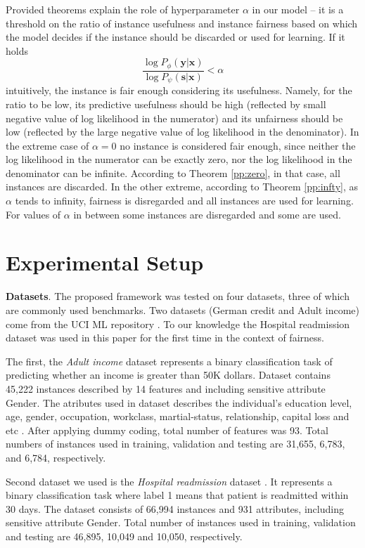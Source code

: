\documentclass[preprint,12pt]{elsarticle}
\begin{document}
Provided theorems explain the role of hyperparameter $\alpha$ in our model -- it is a threshold on the ratio of instance usefulness and instance fairness based on which the model decides if the instance should be discarded or used for learning.
If it holds
$$\frac{\log P_{\phi}(\mathbf{y}|\mathbf{x})}{\log P_{\psi}(\mathbf{s}|\mathbf{x})}<\alpha$$
intuitively, the instance is fair enough considering its usefulness. Namely, for the ratio to be low, its predictive usefulness should be high (reflected by small negative value of log likelihood in the numerator) and its unfairness should be low (reflected by the large negative value of log likelihood in the denominator). In the extreme case of $\alpha=0$ no instance is considered fair enough, since neither the log likelihood in the numerator can be exactly zero, nor the log likelihood in the denominator can be infinite. According to Theorem \ref{pp:zero}, in that case, all instances are discarded. In the other extreme, according to Theorem \ref{pp:infty}, as $\alpha$ tends to infinity,  fairness is disregarded and all instances are used for learning. For values of $\alpha$ in between some instances are disregarded and some are used.


\section{Experimental Setup}
\label{Sec:exp-evaluation}

\textbf{Datasets}. The proposed framework was tested on four datasets, three of which are commonly used benchmarks. Two datasets (German credit and Adult income) come from the UCI ML repository \cite{frank2011uci}. To our knowledge the Hospital readmission dataset was used in this paper for the first time in the context of fairness.

The first, the \textit{Adult income} dataset \cite{kohavi1996scaling} represents a binary classification task of predicting whether an income is greater than 50K dollars. Dataset contains 45,222 instances described by 14 features and including sensitive attribute Gender. The atributes used in dataset describes the individual's education level, age, gender, occupation, workclass, martial-status, relationship, capital loss and etc \cite{Dua:2019}. After applying dummy coding, total number of features was 93. Total numbers of instances used in training, validation and testing are 31,655, 6,783, and 6,784, respectively.

Second dataset we used is the \textit{Hospital readmission} dataset \cite{stiglic2015comprehensible}. It represents a binary classification task where label 1 means that patient is readmitted within 30 days. The dataset consists of 66,994 instances and 931 attributes, including sensitive attribute Gender. Total number of instances used in training, validation and testing are 46,895, 10,049 and 10,050, respectively.
\end{document}
